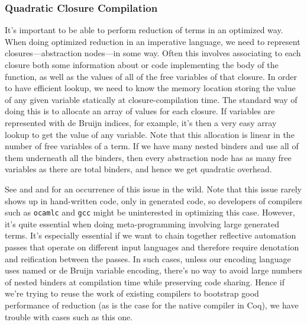\subsubsection{Quadratic Closure Compilation} \label{sec:perf:closure-compilation} \label{sec:perf:quadratic-vm-native}
It's important to be able to perform reduction of terms in an optimized way.
When doing optimized reduction in an imperative language, we need to represent closures---abstraction nodes---in some way.
Often this involves associating to each closure both some information about or code implementing the body of the function, as well as the values of all of the free variables of that closure.
In order to have efficient lookup, we need to know the memory location storing the value of any given variable statically at closure-compilation time.
The standard way of doing this  is to allocate an array of values for each closure.
If variables are represented with de Bruijn indices, for example, it's then a very easy array lookup to get the value of any variable.
Note that this allocation is linear in the number of free variables of a term.
If we have many nested binders and use all of them underneath all the binders, then every abstraction node has as many free variables as there are total binders, and hence we get quadratic overhead.

See  and  and  for an occurrence of this issue in the wild.
Note that this issue rarely shows up in hand-written code, only in generated code, so developers of compilers such as \texttt{ocamlc} and \texttt{gcc} might be uninterested in optimizing this case.
However, it's quite essential when doing meta-programming involving large generated terms.
It's especially essential if we want to chain together reflective automation passes that operate on different input languages and therefore require denotation and reification between the passes.
In such cases, unless our encoding language uses named or de Bruijn variable encoding, there's no way to avoid large numbers of nested binders at compilation time while preserving code sharing.
Hence if we're trying to reuse the work of existing compilers to bootstrap good performance of reduction (as is the case for the native compiler in Coq), we have trouble with cases such as this one.

